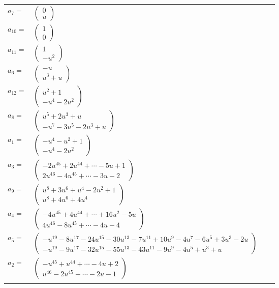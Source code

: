 \documentclass[1p]{elsarticle_modified}
\theoremstyle{definition}
\begin{document}
\begin{tabular}{m{7pt} m{180pt} m{7pt} m{180pt} }
\flushright $a_{7}=$&$\begin{pmatrix}0\\u\end{pmatrix}$ \\
\flushright $a_{10}=$&$\begin{pmatrix}1\\0\end{pmatrix}$ \\
\flushright $a_{11}=$&$\begin{pmatrix}1\\- u^2\end{pmatrix}$ \\
\flushright $a_{6}=$&$\begin{pmatrix}- u\\u^3+u\end{pmatrix}$ \\
\flushright $a_{12}=$&$\begin{pmatrix}u^2+1\\- u^4-2 u^2\end{pmatrix}$ \\
\flushright $a_{8}=$&$\begin{pmatrix}u^5+2 u^3+u\\- u^7-3 u^5-2 u^3+u\end{pmatrix}$ \\
\flushright $a_{1}=$&$\begin{pmatrix}- u^4- u^2+1\\- u^4-2 u^2\end{pmatrix}$ \\
\flushright $a_{3}=$&$\begin{pmatrix}-2 u^{45}+2 u^{44}+\cdots-5 u+1\\2 u^{46}-4 u^{45}+\cdots-3 u-2\end{pmatrix}$ \\
\flushright $a_{9}=$&$\begin{pmatrix}u^8+3 u^6+u^4-2 u^2+1\\u^8+4 u^6+4 u^4\end{pmatrix}$ \\
\flushright $a_{4}=$&$\begin{pmatrix}-4 u^{45}+4 u^{44}+\cdots+16 u^2-5 u\\4 u^{46}-8 u^{45}+\cdots-4 u-4\end{pmatrix}$ \\
\flushright $a_{5}=$&$\begin{pmatrix}- u^{19}-8 u^{17}-24 u^{15}-30 u^{13}-7 u^{11}+10 u^9-4 u^7-6 u^5+3 u^3-2 u\\- u^{19}-9 u^{17}-32 u^{15}-55 u^{13}-43 u^{11}-9 u^9-4 u^5+u^3+u\end{pmatrix}$ \\
\flushright $a_{2}=$&$\begin{pmatrix}- u^{45}+u^{44}+\cdots-4 u+2\\u^{46}-2 u^{45}+\cdots-2 u-1\end{pmatrix}$\\&\end{tabular}
\end{document}

